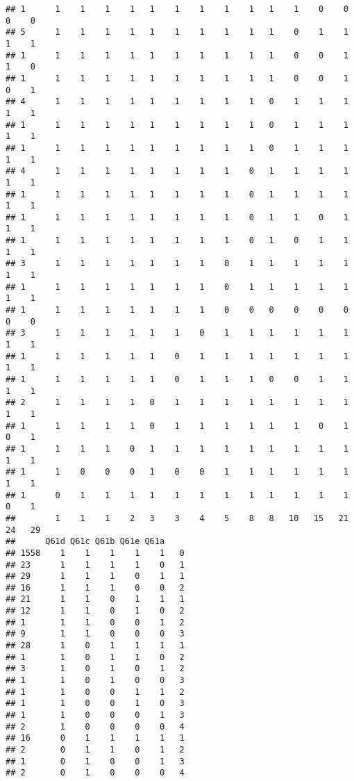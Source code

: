 \documentclass[
]{article}
\begin{document}
\begin{verbatim}
## 1      1    1    1    1   1    1    1    1    1   1    1    0    0    0    0
## 5      1    1    1    1   1    1    1    1    1   1    0    1    1    1    1
## 1      1    1    1    1   1    1    1    1    1   1    0    0    1    1    0
## 1      1    1    1    1   1    1    1    1    1   1    0    0    1    0    1
## 4      1    1    1    1   1    1    1    1    1   0    1    1    1    1    1
## 1      1    1    1    1   1    1    1    1    1   0    1    1    1    1    1
## 1      1    1    1    1   1    1    1    1    1   0    1    1    1    1    1
## 4      1    1    1    1   1    1    1    1    0   1    1    1    1    1    1
## 1      1    1    1    1   1    1    1    1    0   1    1    1    1    1    1
## 1      1    1    1    1   1    1    1    1    0   1    1    0    1    1    1
## 1      1    1    1    1   1    1    1    1    0   1    0    1    1    1    1
## 3      1    1    1    1   1    1    1    0    1   1    1    1    1    1    1
## 1      1    1    1    1   1    1    1    0    1   1    1    1    1    1    1
## 1      1    1    1    1   1    1    1    0    0   0    0    0    0    0    0
## 3      1    1    1    1   1    1    0    1    1   1    1    1    1    1    1
## 1      1    1    1    1   1    0    1    1    1   1    1    1    1    1    1
## 1      1    1    1    1   1    0    1    1    1   0    0    1    1    1    1
## 2      1    1    1    1   0    1    1    1    1   1    1    1    1    1    1
## 1      1    1    1    1   0    1    1    1    1   1    1    0    1    0    1
## 1      1    1    1    0   1    1    1    1    1   1    1    1    1    1    1
## 1      1    0    0    0   1    0    0    1    1   1    1    1    1    1    1
## 1      0    1    1    1   1    1    1    1    1   1    1    1    1    0    1
##        1    1    1    2   3    3    4    5    8   8   10   15   21   24   29
##      Q61d Q61c Q61b Q61e Q61a    
## 1558    1    1    1    1    1   0
## 23      1    1    1    1    0   1
## 29      1    1    1    0    1   1
## 16      1    1    1    0    0   2
## 21      1    1    0    1    1   1
## 12      1    1    0    1    0   2
## 1       1    1    0    0    1   2
## 9       1    1    0    0    0   3
## 28      1    0    1    1    1   1
## 1       1    0    1    1    0   2
## 3       1    0    1    0    1   2
## 1       1    0    1    0    0   3
## 1       1    0    0    1    1   2
## 1       1    0    0    1    0   3
## 1       1    0    0    0    1   3
## 2       1    0    0    0    0   4
## 16      0    1    1    1    1   1
## 2       0    1    1    0    1   2
## 1       0    1    0    0    1   3
## 2       0    1    0    0    0   4

\end{verbatim}
\end{document}
